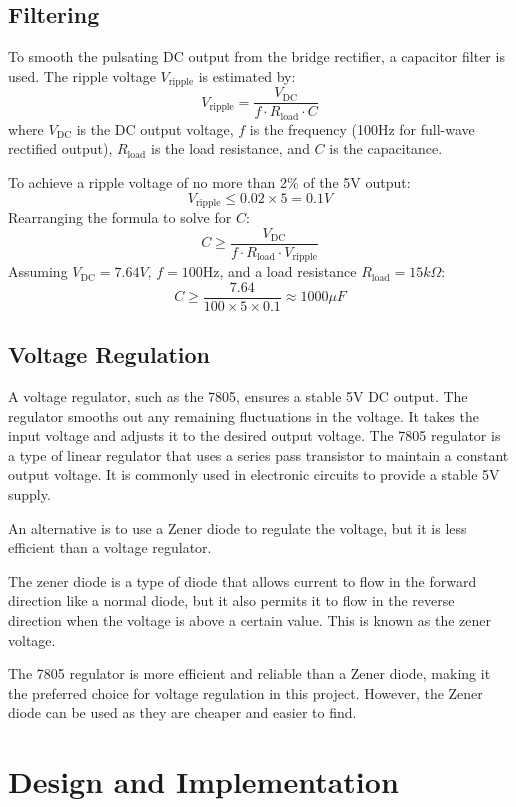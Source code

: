 \documentclass{zc-ust-hw}
\begin{document}
\subsection{Filtering}

To smooth the pulsating DC output from the bridge rectifier, a capacitor filter is used. The ripple voltage \( V_{\text{ripple}} \) is estimated by:
\[
V_{\text{ripple}} = \frac{V_{\text{DC}}}{f \cdot R_{\text{load}} \cdot C}
\]
where \( V_{\text{DC}} \) is the DC output voltage, \( f \) is the frequency (100Hz for full-wave rectified output), \( R_{\text{load}} \) is the load resistance, and \( C \) is the capacitance.

To achieve a ripple voltage of no more than 2\% of the 5V output:
\[
V_{\text{ripple}} \leq 0.02 \times 5 = 0.1V
\]
Rearranging the formula to solve for \( C \):
\[
C \geq \frac{V_{\text{DC}}}{f \cdot R_{\text{load}} \cdot V_{\text{ripple}}}
\]
Assuming \( V_{\text{DC}} = 7.64V \), \( f = 100 \text{Hz} \), and a load resistance \( R_{\text{load}} = 15 k\Omega \):
\[
C \geq \frac{7.64}{100 \times 5 \times 0.1} \approx 1000 \mu F
\]

\subsection{Voltage Regulation}

A voltage regulator, such as the 7805, ensures a stable 5V DC output. The
regulator smooths out any remaining fluctuations in the voltage. It takes the
input voltage and adjusts it to the desired output voltage. The 7805 regulator
is a type of linear regulator that uses a series pass transistor to maintain a
constant output voltage. It is commonly used in electronic circuits to provide
a stable 5V supply.

An alternative is to use a Zener diode to regulate the voltage, but it is less
efficient than a voltage regulator.

The zener diode is a type of diode that allows current to flow in the forward
direction like a normal diode, but it also permits it to flow in the reverse
direction when the voltage is above a certain value. This is known as the zener
voltage.

The 7805 regulator is more efficient and reliable than a Zener diode, making it
the preferred choice for voltage regulation in this project. However, the Zener
diode can be used as they are cheaper and easier to find.

\section{Design and Implementation}
\end{document}
